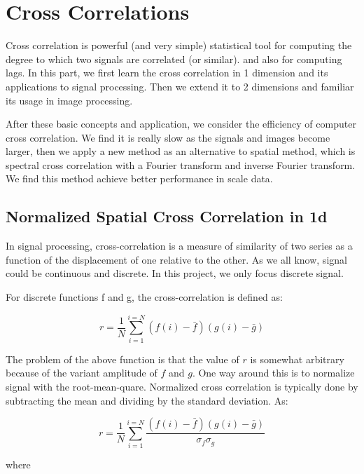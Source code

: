 \chapter{Cross Correlations}\label{part: cross correlations}

Cross correlation is powerful (and very simple) statistical tool for computing the degree to which two signals are correlated (or similar). and also for computing lags. In this part, we first learn the cross correlation in 1 dimension and its applications to signal processing. Then we extend it to 2 dimensions and familiar its usage in image processing. 

After these basic concepts and application, we consider the efficiency of computer cross correlation. We find it is really slow as the signals and images become larger, then we apply a new method as an alternative to spatial method, which is spectral cross correlation with a Fourier transform and inverse Fourier transform. We find this method achieve better performance in scale data.

\section{Normalized Spatial Cross Correlation in 1d}

In signal processing, cross-correlation is a measure of similarity of two series as a function of the displacement of one relative to the other. As we all know, signal could be continuous and discrete. In this project, we only focus discrete signal. 

For discrete functions f and g, the cross-correlation is defined as:

\begin{equation*}
r=\frac{1}{N}
\sum_{i=1}^{i=N}(f(i)-\bar{f})(g(i)-\bar{g})
\end{equation*}

The problem of the above function is that the value of $r$ is somewhat arbitrary because of the variant amplitude of $f$ and $g$. One way around this is to normalize signal with the root-mean-quare. Normalized cross correlation is typically done by subtracting the mean and dividing by the standard deviation. As:

\begin{equation*}
r=\frac{1}{N}
\sum_{i=1}^{i=N}
\frac{(f(i)-\bar{f})(g(i)-\bar{g})}{\sigma _{f}\sigma _{g}}
\end{equation*}

where


